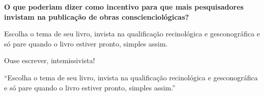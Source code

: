 \documentclass{gescons}
\begin{document}
\begin{multicols}{2}
\textbf{O que poderiam dizer como incentivo para que mais pesquisadores invistam na publicação de obras conscienciológicas?}

Escolha o tema de seu livro, invista na qualificação recinológica e gesconográfica e só pare quando o livro estiver pronto, simples assim. 

Ouse escrever, intemissivista!

\begin{pullquote}
``Escolha o tema de seu livro, invista na qualificação recinológica e gesconográfica e só pare quando o livro estiver pronto, simples assim.''
\end{pullquote}



    
    \end{multicols}
\end{document}
